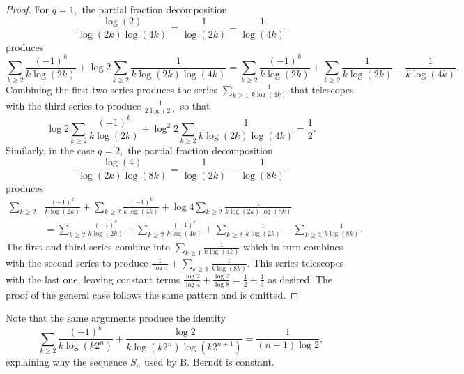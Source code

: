 \documentclass[11pt,oneside,reqno]{article}
\theoremstyle{definition}
\begin{document}
\begin{proof}
For $q=1,$ the partial fraction decomposition 
\begin{equation}
\nonumber
\frac{\log\left(2\right)}{\log\left(2k\right)\log\left(4k\right)}=\frac{1}{\log\left(2k\right)}-\frac{1}{\log\left(4k\right)}
\end{equation}
produces
\begin{equation}
\nonumber
\sum_{k\ge2}\frac{\left(-1\right)^{k}}{k\log\left(2k\right)}+\log2\sum_{k\ge2}\frac{1}{k\log\left(2k\right)\log\left(4k\right)}
=\sum_{k\ge2}\frac{\left(-1\right)^{k}}{k\log\left(2k\right)}+\sum_{k\ge2}\frac{1}{k\log\left(2k\right)}-
\frac{1}{k\log\left(4k\right)}.
\end{equation}
Combining the first two series produces the series $\sum_{k\ge1}
\frac{1}{k\log\left(4k\right)}$ that telescopes with the third series to  produce $\frac{1}{2\log(2)}$ so that
\begin{equation}
\nonumber
\log2\sum_{k\ge2}\frac{\left(-1\right)^{k}}{k\log\left(2k\right)}+\log^{2}2\sum_{k\ge2}\frac{1}{k\log\left(2k\right)\log\left(4k\right)}=\frac{1}{2}.
\end{equation}
Similarly, in the case $q=2,$ the partial fraction decomposition 
\begin{equation}
\nonumber
\frac{\log\left(4\right)}{\log\left(2k\right)\log\left(8k\right)}=\frac{1}{\log\left(2k\right)}-\frac{1}{\log\left(8k\right)}
\end{equation}
produces
\begin{align}
\sum_{k\ge2}&\frac{\left(-1\right)^{k}}{k\log\left(2k\right)}+\sum_{k\ge2}\frac{\left(-1\right)^{k}}{k\log\left(4k\right)}+\log4\sum_{k\ge2}\frac{1}{k\log\left(2k\right)\log\left(8k\right)}\nonumber
\\
\nonumber
&=\sum_{k\ge2}\frac{\left(-1\right)^{k}}{k\log\left(2k\right)}+\sum_{k\ge2}\frac{\left(-1\right)^{k}}{k\log\left(4k\right)}+\sum_{k\ge2}\frac{1}{k\log\left(2k\right)}-\sum_{k\ge2}\frac{1}{k\log\left(8k\right)}.
\end{align}
The first and third series combine into $\sum_{k\ge1}\frac{1}{k\log\left(4k\right)}$ which in turn combines with the second series to produce $\frac{1}{\log 4}+\sum_{k\ge1}\frac{1}{k\log\left(8k\right)}.$ This series telescopes with the last one, leaving constant terms
$\frac{\log 2}{\log 4}+\frac{\log 2}{\log 8}=\frac{1}{2}+\frac{1}{3}$ as desired.
The proof of the general case follows the same pattern and is omitted.
\end{proof}
Note that the same arguments produce the identity
\begin{equation}
\sum_{k\ge2}\frac{(-1)^k}{k \log(k2^n)} +\frac{\log2}{k\log(k2^n)\log(k2^{n+1})}=\frac{1}{(n+1)\log2},
\end{equation}
explaining why the sequence $S_n$ used by B. Berndt is constant.
\end{document}
